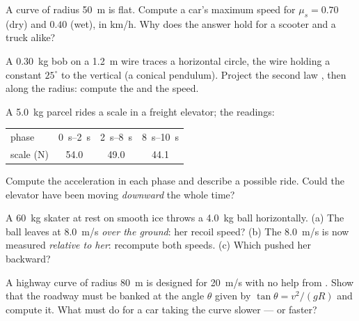 \begin{exercise}[$\star\star$]\label{exo:g12:newtons-laws:9}
A curve of radius \qty{50}{m} is flat. Compute a car's maximum speed for
$\mu_s = 0.70$ (dry) and $0.40$ (wet), in \unit{km/h}. Why does the answer hold for
a scooter and a truck alike?
\end{exercise}

\begin{exercise}[$\star\star$]\label{exo:g12:newtons-laws:10}
A \qty{0.30}{kg} bob on a \qty{1.2}{m} wire traces a horizontal circle, the wire
holding a constant $25^\circ$ to the vertical (a conical pendulum). Project the
second law , then along the radius: compute the  and the speed.
\end{exercise}

\begin{exercise}[$\star\star$]\label{exo:g12:newtons-laws:11}
A \qty{5.0}{kg} parcel rides a scale in a freight elevator; the readings:
\begin{center}\small\begin{tabular}{lccc}
phase & \qtyrange{0}{2}{s} & \qtyrange{2}{8}{s} & \qtyrange{8}{10}{s}\\
scale (\unit{N}) & 54.0 & 49.0 & 44.1
\end{tabular}\end{center}
Compute the acceleration in each phase and describe a possible ride. Could the
elevator have been moving \emph{downward} the whole time?
\end{exercise}

\begin{exercise}[$\star\star\star$]\label{exo:g12:newtons-laws:12}
A \qty{60}{kg} skater at rest on smooth ice throws a \qty{4.0}{kg} ball
horizontally. (a) The ball leaves at \qty{8.0}{m/s} \emph{over the ground}: her
recoil speed? (b) The \qty{8.0}{m/s} is now measured \emph{relative to her}:
recompute both speeds. (c) Which  pushed her backward?
\end{exercise}

\begin{exercise}[$\star\star\star$]\label{exo:g12:newtons-laws:13}
A highway curve of radius \qty{80}{m} is designed for \qty{20}{m/s} with no help from
. Show that the roadway must be banked at the angle $\theta$ given by
$\tan\theta = v^2/(gR)$ and compute it. What must  do for a car taking the
curve slower --- or faster?
\end{exercise}

